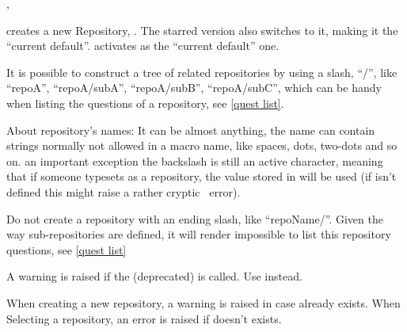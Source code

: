 \documentclass[10pt]{article}
\begin{document}
\begin{codedescribe}[code,update=2025/10/01]{,\SelectRepository}
\begin{codesyntax}%
\end{codesyntax}
 creates a new Repository, . The starred version also switches to it, making it the ``current default''.
\tsobj{\SelectRepository} activates  as the ``current default'' one.

It is possible to construct a tree of related repositories by using a slash, ``/'', like ``repoA'', ``repoA/subA'', ``repoA/subB'', ``repoA/subC'', which can be handy when listing the questions of a repository, see \ref{quest list}.
\end{codedescribe}

\begin{tsremark}
About repository's names: It can be almost anything, the name can contain strings normally not allowed in a macro name, like spaces, dots, two-dots and so on. an important exception the backslash is still an active character, meaning that if someone typesets \tsobj{\XYZ} as a repository, the value stored in \tsobj{\XYZ} will be used (if \tsobj{\XYZ} isn't defined this might raise a rather cryptic \LaTeXe\ error).
\end{tsremark}

\begin{tsremark}
Do not create a repository with an ending slash, like ``repoName/''. Given the way sub-repositories are defined, it will render impossible to list this repository questions, see \ref{quest list}
\end{tsremark}


\begin{tsremark}
  A warning is raised if the (deprecated)  is called. Use  instead.
\end{tsremark}

\begin{tsremark}
When creating a new repository, a warning is raised  in case  already exists. 
When Selecting a repository, an error is raised if  doesn't exists.
\end{tsremark}
\end{document}
